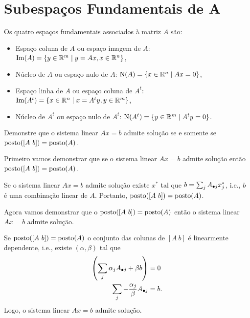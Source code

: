 \begin{questions}
\begin{parts}
\begin{solution}
        \end{solution}
    \end{parts}

    \section*{Subespa\c{c}os Fundamentais de A}
    Os quatro espa\c{c}os fundamentais associados \`{a} matriz $A$ s\~{a}o:
    \begin{itemize}
        \item Espa\c{c}o coluna de $A$ ou espa\c{c}o imagem de $A$: $\text{Im} (A) = \left\{ y \in \mathbb{R}^m \mid y = A x, x \in \mathbb{R}^n \right\}$,
        \item N\'{u}cleo de $A$ ou espa\c{c}o nulo de $A$: $\text{N} (A) = \left\{ x \in \mathbb{R}^n \mid A x = 0 \right\}$,
        \item Espa\c{c}o linha de $A$ ou espa\c{c}o coluna de $A^t$: $\text{Im} (A^t) = \left\{ x \in \mathbb{R}^n \mid x = A^t y , y \in \mathbb{R}^m \right\}$,
        \item N\'{u}cleo de $A^t$ ou espa\c{c}o nulo de $A^t$: $\text{N} (A^t) = \left\{ y \in \mathbb{R}^m \mid A^t y = 0 \right\}$.
    \end{itemize}

    \question Demonstre que o sistema linear $A x = b$ admite solu\c{c}\~{a}o se e somente se $\posto ([A \ b]) = \posto (A)$.
    \begin{solution}
        Primeiro vamos demonstrar que se o sistema linear $A x = b$ admite solu\c{c}\~{a}o ent\~{a}o $\posto ([A \ b]) = \posto (A)$.

        Se o sistema linear $A x = b$ admite solu\c{c}\~{a}o existe $x^*$ tal que $b = \sum_j A_{\bullet j} x^*_j$, i.e., $b$ \'{e} uma combina\c{c}\~{a}o linear de $A$. Portanto, $\posto ([A \ b]) = \posto (A)$.

        Agora vamos demonstrar que o $\posto ([A \ b]) = \posto (A)$ ent\~{a}o o sistema linear $A x = b$ admite solu\c{c}\~{a}o.

        Se $\posto ([A \ b]) = \posto (A)$ o conjunto das colunas de $[A \ b]$ \'{e} linearmente dependente, i.e., existe $(\alpha, \beta)$ tal que
        \begin{align*}
            \left( \sum_j \alpha_j A_{\bullet j} + \beta b \right) &= 0 \\
            \sum_j - \frac{\alpha_j}{\beta} A_{\bullet j} &= b.
        \end{align*}
        Logo, o sistema linear $A x = b$ admite solu\c{c}\~{a}o.
    \end{solution}


\end{questions}
